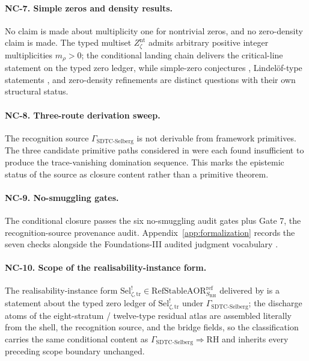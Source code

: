 \documentclass[11pt]{article}
\newcommand{\Znt}{Z_{\zeta}^{\mathrm{nt}}}
\newcommand{\Sel}{\mathrm{Sel}^{!}_{\zeta,\mathrm{tr}}}
\newcommand{\GamSDTCSelberg}{\Gamma_{\mathrm{SDTC\text{-}Selberg}}}
\theoremstyle{definition}
\begin{document}
\paragraph{NC-7. Simple zeros and density results.}
No claim is made about multiplicity one for nontrivial zeros, and
no zero-density claim is made.  The typed multiset \(\Znt\) admits
arbitrary positive integer multiplicities \(m_{\rho}>0\); the
conditional landing chain delivers the critical-line statement on
the typed zero ledger, while simple-zero conjectures
\citep{Montgomery1973,ConreyGhoshGonek1998}, Lindel\"of-type
statements \citep{TitchmarshHeathBrown1986,Ivic1985}, and
zero-density refinements \citep{Montgomery1971,Ivic1985} are
distinct questions with their own structural status.

\paragraph{NC-8. Three-route derivation sweep.}
The recognition source \(\GamSDTCSelberg\) is not derivable from
framework primitives.  The three candidate primitive paths
considered in  were each found
insufficient to produce the trace-vanishing domination sequence.
This marks the epistemic status of the source as closure content
rather than a primitive theorem.

\paragraph{NC-9. No-smuggling gates.}
The conditional closure passes the six no-smuggling audit gates
plus Gate 7, the recognition-source provenance audit.
Appendix~\ref{app:formalization} records the seven checks alongside
the Foundations-III audited judgment vocabulary
\cite{TsiokosFoundationsIII2026}.

\paragraph{NC-10. Scope of the realisability-instance form.}
The realisability-instance form
\(\Sel\in\mathrm{RefStableAOR}^{\mathrm{ref}}_{S_{\mathrm{RH}}}\)
delivered by  is a
statement about the typed zero ledger of \(\Sel\) under
\(\GamSDTCSelberg\); the discharge atoms of the eight-stratum /
twelve-type residual atlas are assembled literally from the shell,
the recognition source, and the bridge fields, so the
classification carries the same conditional content as
\(\GamSDTCSelberg \Rightarrow \mathrm{RH}\) and inherits every
preceding scope boundary unchanged.
\end{document}
